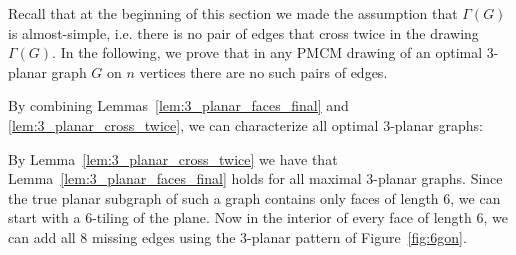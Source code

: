 Recall that at the beginning of this section we made the assumption that $\Gamma(G)$ is almost-simple, i.e. there is no pair of edges that cross twice in the drawing $\Gamma(G)$. In the following, we prove that in any PMCM drawing of an optimal $3$-planar graph $G$ on $n$ vertices there are no such pairs of edges.



By combining Lemmas~\ref{lem:3_planar_faces_final} and \ref{lem:3_planar_cross_twice}, we can characterize all optimal $3$-planar graphs:


 By Lemma~\ref{lem:3_planar_cross_twice} we have that Lemma~\ref{lem:3_planar_faces_final} holds for all maximal $3$-planar graphs. Since the true planar subgraph of such a graph contains only faces of length $6$, we can start with a $6$-tiling of the plane. Now in the interior of every face of length $6$, we can add all  $8$ missing edges using the $3$-planar pattern of Figure~\ref{fig:6gon}.

